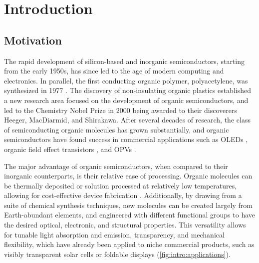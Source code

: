 
\chapter{Introduction}
\label{ch:Introduction}

\section{Motivation}



The rapid development of silicon-based and inorganic semiconductors, starting from the early 1950s, has since led to the age of modern computing and electronics. In parallel, the first conducting organic polymer, polyacetylene, was synthesized in 1977 \citep{shirakawa1977synthesis,chiang1977electrical}. The discovery of non-insulating organic plastics established a new research area focused on the development of organic semiconductors, and led to the Chemistry Nobel Prize in 2000 being awarded to their discoverers Heeger, MacDiarmid, and Shirakawa. After several decades of research, the class of semiconducting organic molecules has grown substantially, and organic semiconductors have found success in commercial applications such as \acfp{OLED} \citep{zhu2011solution,ying2014white}, organic field effect transistors \citep{torsi2013organic,tatum2018pi}, and \acfp{OPV} \citep{holliday2017recent,espinosa2015solution,gregg2003comparing,lewis2007toward}. 

The major advantage of organic semiconductors, when compared to their inorganic counterparts, is their relative ease of processing. Organic molecules can be thermally deposited or solution processed at relatively low temperatures, allowing for cost-effective device fabrication \citep{yip2012recent,huang2019organic}. Additionally, by drawing from a suite of chemical synthesis techniques, new molecules can be created largely from Earth-abundant elements, and engineered with different functional groups to have the desired optical, electronic, and structural properties. This versatility allows for tunable light absorption and emission, transparency, and mechanical flexibility, which have already been applied to niche commercial products, such as visibly transparent solar cells or foldable displays (\autoref{fig:intro:applications}). 

